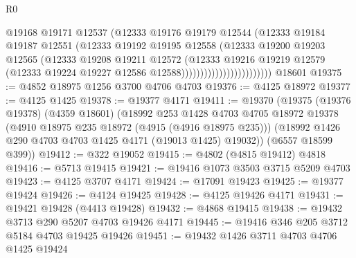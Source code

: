 \begin{lexlean}{R0}
\begin{coremodule}
                                      @19168
                                      @19171
                                      @12537
                                      (@12333
                                        @19176
                                        @19179
                                        @12544
                                        (@12333
                                          @19184
                                          @19187
                                          @12551
                                          (@12333
                                            @19192
                                            @19195
                                            @12558
                                            (@12333
                                              @19200
                                              @19203
                                              @12565
                                              (@12333
                                                @19208
                                                @19211
                                                @12572
                                                (@12333
                                                  @19216
                                                  @19219
                                                  @12579
                                                  (@12333
                                                    @19224
                                                    @19227
                                                    @12586
                                                    @12588))))))))))))))))))))))))
    @18601
@19375 := @4852 @18975 @1256 @3700 @4706 @4703
@19376 := @4125 @18972
@19377 := @4125 @1425
@19378 := @19377 @4171
@19411 := @19370
    (@19375
      (@19376 @19378)
      (@4359 @18601)
      (@18992
        @253
        @1428
        @4703
        @4705
        @18972
        @19378
        (@4910 @18975 @235 @18972 (@4915 (@4916 @18975 @235)))
        (@18992 @1426 @290 @4703 @4703 @1425 @4171 (@19013 @1425) @19032))
      (@6557 @18599 @399))
@19412 := @322 @19052
@19415 := @4802 (@4815 @19412) @4818
@19416 := @5713 @19415
@19421 := @19416 @1073 @3503 @3715 @5209 @4703
@19423 := @4125 @3707 @4171
@19424 := @17091 @19423
@19425 := @19377 @19424
@19426 := @4124 @19425
@19428 := @4125 @19426 @4171
@19431 := @19421 @19428 (@4413 @19428)
@19432 := @4868 @19415
@19438 := @19432 @3713 @290 @5207 @4703 @19426 @4171
@19445 := @19416 @346 @205 @3712 @5184 @4703 @19425 @19426
@19451 := @19432 @1426 @3711 @4703 @4706 @1425 @19424

\end{coremodule}
\end{lexlean}
